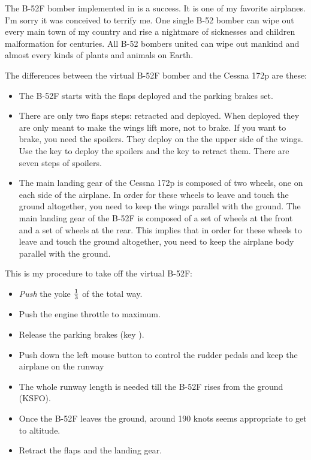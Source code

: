   The B-52F bomber implemented in \FlightGear is a success. It is one of my
  favorite airplanes. I'm sorry it was conceived to terrify me. One
  single B-52 bomber can wipe out every main town of my country and
  rise a nightmare of sicknesses and children malformation for
  centuries. All B-52 bombers united can wipe out mankind and almost
  every kinds of plants and animals on Earth.
  
  The differences between the virtual B-52F bomber and the Cessna 172p are these:
\begin{itemize}
	\item The B-52F starts with the flaps deployed and the parking brakes set.
	\item There are only two flaps steps: retracted and deployed. When deployed they are only meant to make the wings lift more, not to brake. If you want to brake, you need the spoilers. They deploy on the the upper side of the wings. Use the key  to deploy the spoilers and the key  to retract them. There are seven steps of spoilers.
	\item The main landing gear of the Cessna 172p is composed of two wheels, one on each side of the airplane. In order for these wheels to leave and touch the ground altogether, you need to keep the wings parallel with the ground. The main landing gear of the B-52F is composed of a set of wheels at the front and a set of wheels at the rear. This implies that in order for these wheels to leave and touch the ground altogether, you need to keep the airplane body parallel with the ground. 
\end{itemize}
This is my procedure to take off the virtual B-52F:
\begin{itemize}
	\item \emph{Push} the yoke  $1\over3$ of the total way.
	\item Push the engine throttle to maximum.
	\item Release the parking brakes (key ).
	\item Push down the left mouse button to control the rudder pedals and keep the airplane on the runway
	\item The whole runway length is needed till the B-52F rises from the ground (KSFO).
	\item Once the B-52F leaves the ground, around 190 knots seems appropriate to get to altitude.
	\item Retract the flaps and the landing gear. 
\end{itemize}

